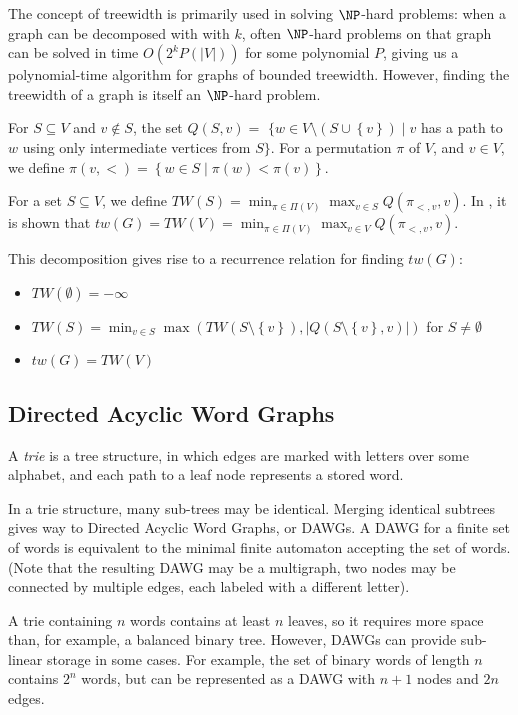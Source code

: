 \documentclass{article}
\newcommand\abs[1]{\left|#1\right|}
\newcommand\set[1]{\left\{#1\right\}}
\newcommand\sst[0]{\mid}
\begin{document}
The concept of treewidth is primarily used in solving $\NP$-hard problems:
when a graph can be decomposed with with $k$, often $\NP$-hard problems
on that graph can be solved in time $O(2^k P(\abs{V}))$ for some polynomial $P$,
giving us a polynomial-time algorithm for graphs of bounded treewidth.
However, finding the treewidth of a graph is itself an $\NP$-hard problem.

For $S \subseteq V$ and $v \not \in S$, the set $Q(S,v) =$
$\{w \in V \setminus (S \cup \set{v}) \sst v $ has a path to $w$ using only intermediate vertices from $S  \}$.
For a permutation $\pi$ of $V$, and $v \in V$, we define $\pi(v, <) = \set{w \in S \sst \pi(w) < \pi(v)}$.

For a set $S \subseteq V$, we define $TW(S) = \min_{\pi \in \Pi(V)} \max_{v \in S} Q(\pi_{<,v}, v)$.
In \cite{exact}, it is shown that $tw(G) = TW(V) = \min_{\pi \in \Pi(V)} \max_{v \in V} Q(\pi_{<,v}, v)$.

This decomposition gives rise to a recurrence relation for finding $tw(G)$:

\begin{itemize}
\item $TW(\emptyset) = -\infty$
\item $TW(S) = \min_{v \in S} \max(TW(S \setminus \set{v}), \abs{Q(S \setminus \set{v}, v)})$ for $S \neq \emptyset$
\item $tw(G) = TW(V)$
\end{itemize}

\subsection{Directed Acyclic Word Graphs}

A \textit{trie} is a tree structure, in which edges are marked with letters over some alphabet,
and each path to a leaf node represents a stored word.

In a trie structure, many sub-trees may be identical. 
Merging identical subtrees gives way to Directed Acyclic Word Graphs, or DAWGs.
A DAWG for a finite set of words is equivalent to the 
minimal finite automaton accepting the set of words. 
(Note that the resulting DAWG may be a multigraph, two nodes
may be connected by multiple edges, each labeled with a different letter).

A trie containing $n$ words contains at least $n$ leaves, so it requires more space than,
for example, a balanced binary tree. However, DAWGs can provide sub-linear storage in some cases.
For example, the set of binary words of length $n$ contains $2^n$ words, but can be represented
as a DAWG with $n+1$ nodes and $2n$ edges.
\end{document}
